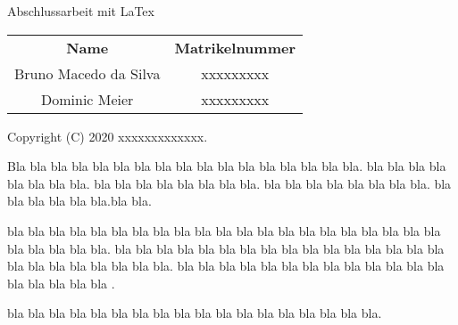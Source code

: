 \begin{titlepage}
    \vspace*{7cm}
    \begin{center}
        \Huge
        Abschlussarbeit mit LaTex\\
        \vspace{1cm}
        \large
        \vspace{2cm}
         \begin {table}[ht]
             \centering
             \begin{tabular}{c|c}
                 \textbf{Name} & \textbf{Matrikelnummer} \\
                 Bruno Macedo da Silva & xxxxxxxxx \\
                 Dominic Meier         & xxxxxxxxx \\
             \end{tabular}
         \end {table}
    \end{center}
    \normalsize
    \vfill
    Copyright (C) 2020 xxxxxxxxxxxxx.

    Bla bla bla bla bla bla bla bla bla bla bla bla bla bla bla bla bla. bla bla bla bla bla bla bla bla. 
    bla bla bla bla bla bla bla bla. bla bla bla bla bla bla bla bla. bla bla bla bla bla bla.bla bla.

    bla bla bla bla bla bla bla bla bla bla bla bla bla bla bla bla bla bla bla bla bla bla bla bla bla bla.
    bla bla bla bla bla bla bla bla bla bla bla bla bla bla bla bla bla bla bla bla bla bla bla bla.
    bla bla bla bla bla bla bla bla bla bla bla bla bla bla bla bla bla bla .


    bla bla bla bla bla bla bla bla bla bla bla bla bla bla bla bla bla bla.


\end{titlepage}